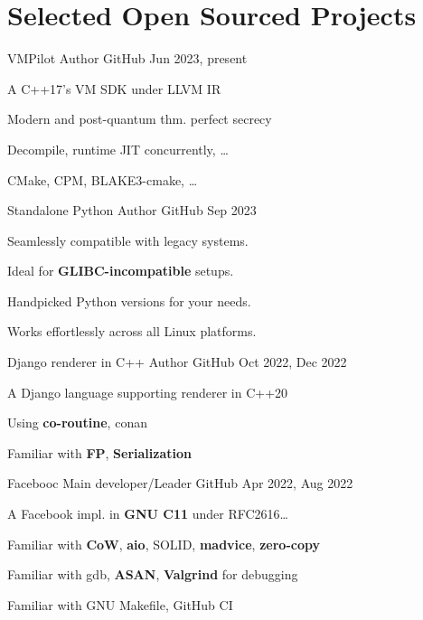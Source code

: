 \section*{Selected Open Sourced Projects}
\vspace*{-25pt}
\begin{multicols}{2}
\def\customTextWidth{0.5\textwidth}
\cventry
{VMPilot}
{Author}
{GitHub}
{Jun 2023, present}
{
    \begin{cvitem}
        \item {A C++17's VM SDK under LLVM IR}
        \item {Modern and post-quantum thm. perfect secrecy}
        \item {Decompile, runtime JIT concurrently, \dots}
        \item {CMake, CPM, BLAKE3-cmake, \dots}
    \end{cvitem}
}

\cventry
{Standalone Python}
{Author}
{GitHub}
{Sep 2023}
{
    \begin{cvitem}
        \item {Seamlessly compatible with legacy systems.}
        \item {Ideal for \textbf{GLIBC-incompatible} setups.}
        \item {Handpicked Python versions for your needs.}
        \item {Works effortlessly across all Linux platforms.}
    \end{cvitem}
}

\cventry
{Django renderer in C++}
{Author}
{GitHub} %
{Oct 2022, Dec 2022} %
{
    \begin{cvitem} %
    \item {A Django language supporting renderer in C++20}
    \item {Using \textbf{co-routine}, conan}
    \item {Familiar with \textbf{FP}, \textbf{Serialization}}
    \end{cvitem}
}

\cventry
{Facebooc}
{Main developer/Leader}
{GitHub} %
{Apr 2022, Aug 2022} %
{
    \begin{cvitem} %
        \item {A Facebook impl. in \textbf{GNU C11} under RFC2616\dots}
        \item {Familiar with \textbf{CoW}, \textbf{aio}, SOLID, \textbf{madvice}, \textbf{zero-copy}}
        \item {Familiar with gdb, \textbf{ASAN}, \textbf{Valgrind} for debugging}
        \item {Familiar with GNU Makefile, GitHub CI}
    \end{cvitem}
}


\end{multicols}
